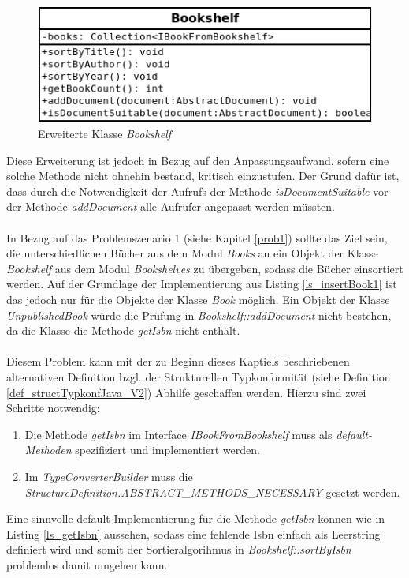 \documentclass[11pt, 
ngerman,
doublespacing,
chapterinoneline, %
consistentlayout, %
]{scrartcl}
\begin{document}
\begin{figure}[h]
\centering
\includegraphics[scale=0.5]{pics/cd_erwBookshelf.png}
\caption{Erweiterte Klasse \emph{Bookshelf}}
\label{cd_erwBookshelf}
\end{figure}
Diese Erweiterung ist jedoch in Bezug auf den Anpassungsaufwand, sofern eine solche Methode nicht ohnehin bestand, kritisch einzustufen. Der Grund dafür ist, dass durch die Notwendigkeit der Aufrufs der Methode \emph{isDocumentSuitable} vor der Methode \emph{addDocument} alle Aufrufer angepasst werden müssten.\\\\
In Bezug auf das Problemszenario 1 (siehe Kapitel \ref{prob1}) sollte das Ziel sein, die unterschiedlichen Bücher aus dem Modul \emph{Books} an ein Objekt der Klasse  \emph{Bookshelf} aus dem Modul \emph{Bookshelves} zu übergeben, sodass die Bücher einsortiert werden. Auf der Grundlage der Implementierung aus Listing \ref{ls_insertBook1} ist das jedoch nur für die Objekte der Klasse \emph{Book} möglich. Ein Objekt der Klasse \emph{UnpublishedBook} würde die Prüfung in \emph{Bookshelf::addDocument} nicht bestehen, da die Klasse die Methode \emph{getIsbn} nicht enthält.\\\\
Diesem Problem kann mit der zu Beginn dieses Kaptiels beschriebenen alternativen Definition bzgl. der Strukturellen Typkonformität (siehe Definition \ref{def_structTypkonfJava_V2}) Abhilfe geschaffen werden. Hierzu sind zwei Schritte notwendig:
\begin{enumerate}
\item Die Methode \emph{getIsbn} im Interface \emph{IBookFromBookshelf} muss als \emph{default-Methoden} spezifiziert und implementiert werden.
\item Im \emph{TypeConverterBuilder} muss die \emph{StructureDefinition.ABSTRACT\_METHODS\_NECESSARY} gesetzt werden.
\end{enumerate}
Eine sinnvolle default-Implementierung für die Methode \emph{getIsbn} können wie in Listing \ref{ls_getIsbn} aussehen, sodass eine fehlende Isbn einfach als Leerstring definiert wird und somit der Sortieralgorihmus in \emph{Bookshelf::sortByIsbn} problemlos damit umgehen kann.
\end{document}

